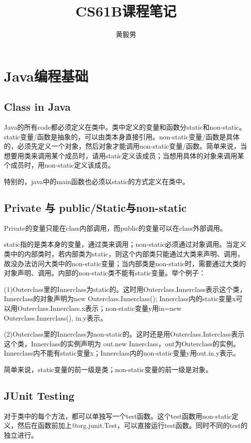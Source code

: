 \documentclass{article}
\title{\heiti CS61B课程笔记}
\author{黄毅男}
\date{}
\begin{document}
	\maketitle
	\tableofcontents
	\section{Java编程基础}
	\subsection{Class in Java}
	Java的所有code都必须定义在类中。类中定义的变量和函数分static和non-static。static变量/函数是抽象的，可以由类本身直接引用。non-static变量/函数是具体的，必须先定义一个对象，然后对象才能调用non-static变量/函数。简单来说，当想要用类来调用某个成员时，请用static定义该成员；当想用具体的对象来调用某个成员时，用non-static定义该成员。
	
	特别的，java中的main函数也必须以static的方式定义在类中。
	\subsection{Private 与 public/Static与non-static}
	Private的变量只能在class内部调用，而public的变量可以在class外部调用。
	
	static指的是类本身的变量，通过类来调用；non-static必须通过对象调用。当定义类中的内部类时，若内部类为static，则这个内部类只能通过大类来声明、调用，故没办法访问大类中的non-static变量；当内部类是non-static时，需要通过大类的对象声明、调用。内部的non-static类不能有static变量。举个例子：
	
	(1)Outerclass里的Innerclass为static的。这时用Outerclass.Innerclass表示这个类，Innerclass的对象声明为new Outerclass.Innerclass(); Innerclass内的static变量x可以用Outerclass.Innerclass.x表示；non-static变量y用in=new Outerclass.Innerclass(), in.y表示。
	
	(2)Outerclass里的Innerclass为non-static的。这时还是用Outerclass.Interclass表示这个类，Innerclass的实例声明为 out.new Innerclass，out为Outerclass的实例。Innerclass内不能有static变量x；Innerclass内的non-static变量y用out.in.y表示。
	
	简单来说，static变量的前一级是类；non-static变量的前一级是对象。
	\subsection{JUnit Testing}
	对于类中的每个方法，都可以单独写一个test函数。这个test函数用non-static定义，然后在函数前加上@org.junit.Test，可以直接运行test函数。同时不同的test的独立进行。
\end{document}
